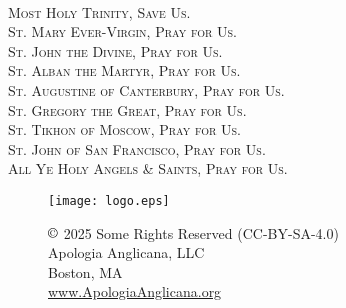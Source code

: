 \checkoddpage
\ifoddpage \thispagestyle{empty}
~\clearpage\fi
\fancyhead[RE,LO]{}\fancyhead[RO,LE]{}\fancyhead[C]{}\thispagestyle{empty}
   \begin{center}
   	{\scshape
   	{\large Most Holy Trinity, Save Us.}\\
   	
   	St. Mary Ever-Virgin, Pray for Us.\\
   	St. John the Divine, Pray for Us.\\
   	St. Alban the Martyr, Pray for Us.\\
   	St. Augustine of Canterbury, Pray for Us.\\
    St. Gregory the Great, Pray for Us.\\
    St. Tikhon of Moscow, Pray for Us.\\
    St. John of San Francisco, Pray for Us.\\
   	All Ye Holy Angels \& Saints, Pray for Us.}
   	\end{center}
   	
   	\vfill
   	
   	\begin{figure}[H]
    	\centering
    	\texttt{[image: logo.eps]}
    	\caption{$\copyright$ 2025 Some Rights Reserved (CC-BY-SA-4.0)\\
		Apologia Anglicana, LLC\\
    	Boston, MA\\
		\url{www.ApologiaAnglicana.org}}
	\end{figure}